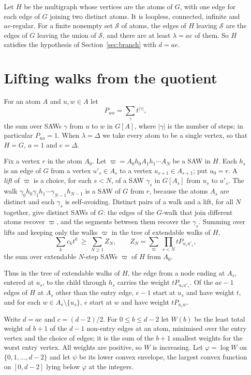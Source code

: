 \documentclass[11pt]{amsart}
\theoremstyle{remark}
\begin{document}
Let $H$ be the multigraph whose vertices are the atoms of $G$, with one edge for each edge of $G$ joining two
distinct atoms. It is loopless, connected, infinite and $ae$-regular. For a finite nonempty set $\mathcal S$ of atoms,
the edges of $H$ leaving $\mathcal S$ are the edges of $G$ leaving the union of $\mathcal S$, and there are at least
$\lambda=ae$ of them. So $H$ satisfies the hypothesis of Section~\ref{sec:branch} with $d=ae$.

\section{Lifting walks from the quotient}\label{sec:lift}

For an atom $A$ and $u,w\in A$ let
\[
P_{uw}=\sum_\gamma t^{|\gamma|},
\]
the sum over SAWs $\gamma$ from $u$ to $w$ in $G[A]$, where $|\gamma|$ is the number of steps; in particular
$P_{uu}=1$. When $\lambda=\Delta$ we take every atom to be a single vertex, so that $H=G$, $a=1$ and $e=\Delta$.

Fix a vertex $r$ in the atom $A_0$. Let $\varpi=A_0h_0A_1h_1\cdots A_N$ be a SAW in $H$. Each $h_s$ is an edge of $G$
from a vertex $u'_s\in A_s$ to a vertex $u_{s+1}\in A_{s+1}$; put $u_0=r$. A \emph{lift} of $\varpi$ is a choice,
for each $s<N$, of a SAW $\gamma_s$ in $G[A_s]$ from $u_s$ to $u'_s$. The walk
$\gamma_0h_0\gamma_1h_1\cdots\gamma_{N-1}h_{N-1}$ is a SAW of $G$ from $r$, because the atoms $A_s$ are distinct and
each $\gamma_s$ is self-avoiding. Distinct pairs of a walk and a lift, for all $N$ together, give distinct SAWs of
$G$: the edges of the $G$-walk that join different atoms recover $\varpi$, and the segments between them recover the
$\gamma_s$. Summing over lifts and keeping only the walks $\varpi$ in the tree of extendable walks of $H$,
\begin{equation}\label{eq:lift}
\sum_kc_kt^k\ \ge\ \sum_{N\ge1}Z_N,\qquad Z_N=\sum_\varpi\ \prod_{s<N}tP_{u_su'_s},
\end{equation}
the sum over extendable $N$-step SAWs $\varpi$ of $H$ from $A_0$.

Thus in the tree of extendable walks of $H$, the edge from a node ending at $A_s$, entered at $u_s$, to the child
through $h_s$ carries the weight $tP_{u_su'_s}$. Of the $ae-1$ edges of $H$ at $A_s$ other than the entry edge, $e-1$
start at $u_s$ and have weight $t$, and for each $w\in A_s\setminus\{u_s\}$, $e$ start at $w$ and have weight
$tP_{u_sw}$.

Write $d=ae$ and $c=(d-2)/2$. For $0\le b\le d-2$ let $W(b)$ be the least total weight of $b+1$ of the $d-1$
non-entry edges at an atom, minimised over the entry vertex and the choice of edges; it is the sum of the $b+1$
smallest weights for the worst entry vertex. All weights are positive, so $W$ is increasing. Let $\varphi=\log W$ on
$\{0,1,\dots,d-2\}$ and let $\psi$ be its lower convex envelope, the largest convex function on $[0,d-2]$ lying below
$\varphi$ at the integers.
\end{document}
